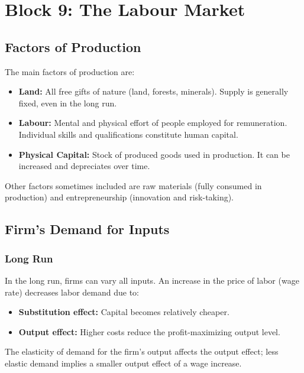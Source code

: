 \chapter*{Block 9: The Labour Market}

\section*{Factors of Production}
The main factors of production are:
\begin{itemize}
    \item \textbf{Land:} All free gifts of nature (land, forests, minerals). Supply is generally fixed, even in the long run.
    \item \textbf{Labour:} Mental and physical effort of people employed for remuneration. Individual skills and qualifications constitute human capital.
    \item \textbf{Physical Capital:} Stock of produced goods used in production. It can be increased and depreciates over time.
\end{itemize}

Other factors sometimes included are raw materials (fully consumed in production) and entrepreneurship (innovation and risk-taking).

\section*{Firm's Demand for Inputs}
\subsection*{Long Run}
In the long run, firms can vary all inputs. An increase in the price of labor (wage rate) decreases labor demand due to:
\begin{itemize}
    \item \textbf{Substitution effect:} Capital becomes relatively cheaper.
    \item \textbf{Output effect:} Higher costs reduce the profit-maximizing output level.
\end{itemize}

The elasticity of demand for the firm's output affects the output effect; less elastic demand implies a smaller output effect of a wage increase.

